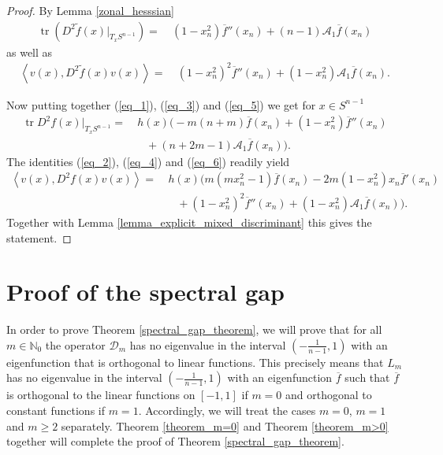 \documentclass[12pt,twoside]{amsart}
\numberwithin{satz}{section}
\theoremstyle{definition}
\numberwithin{equation}{section}
\newcommand\N{\mathbb{N}}
\newcommand\tr{\operatorname{tr}}
\begin{document}
\begin{proof}
		By Lemma \ref{zonal_hesssian} 
		\begin{align}\label{eq_5}
			\tr \left(D^2\tilde{f}(x)\big|_{T_xS^{n-1}}\right)=& \  (1-x_n^2)\overline{f}''(x_n)+(n-1)\mathcal{A}_1\overline{f}(x_n)
		\end{align}
		as well as
		\begin{align}\label{eq_6}
			\left\langle v(x),D^2\tilde{f}(x)v(x)\right\rangle =& \ (1-x_n^2)^2\overline{f}''(x_n)+(1-x_n^2)\mathcal{A}_1\overline{f}(x_n).
		\end{align}
		
		Now putting together (\ref{eq_1}), (\ref{eq_3}) and (\ref{eq_5}) we get for $x\in S^{n-1}$
		\begin{align*}
			\tr D^2f(x)|_{T_xS^{n-1}}=& \ h(x)\big(-m(n+m)\overline{f}(x_n) +(1-x_n^2)\overline{f}''(x_n)\\
			& \quad +(n+2m-1)\mathcal{A}_1\overline{f}(x_n)\big).
		\end{align*}
		The identities (\ref{eq_2}), (\ref{eq_4}) and (\ref{eq_6}) readily yield
		\begin{align*}
			\left\langle v(x), D^2f(x)v(x)\right\rangle =& \ h(x)\big(m(mx_n^2-1)\overline{f}(x_n)-2m(1-x_n^2)x_n\overline{f}'(x_n) \\
			& \quad +(1-x_n^2)^2\overline{f}''(x_n)+(1-x_n^2)\mathcal{A}_1\overline{f}(x_n)\big).
		\end{align*}
		Together with Lemma \ref{lemma_explicit_mixed_discriminant} this gives the statement.
	\end{proof}
	
	\section{Proof of the spectral gap}
	
	In order to prove Theorem \ref{spectral_gap_theorem}, we will prove that for all $m\in \N_0$ the operator $\mathcal{D}_m$ has no eigenvalue in the interval $\left(-\frac{1}{n-1},1\right)$ with an eigenfunction that is orthogonal to linear functions. This precisely means that $L_m$ has no eigenvalue in the interval $\left(-\frac{1}{n-1},1\right)$ with an eigenfunction $\overline{f}$ such that $\overline{f}$ is orthogonal to the linear functions on $[-1,1]$ if $m=0$ and orthogonal to constant functions if $m=1$. Accordingly, we will treat the cases $m=0$, $m=1$ and $m\geq 2$ separately. Theorem \ref{theorem_m=0} and Theorem \ref{theorem_m>0} together will complete the proof of Theorem \ref{spectral_gap_theorem}.
	
\end{document}
